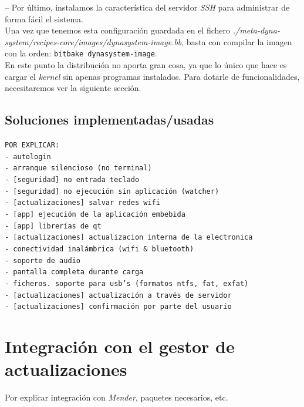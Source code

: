 -- Por último, instalamos la característica del servidor \textit{SSH} para administrar de forma fácil el sistema.\\

Una vez que tenemos esta configuración guardada en el fichero \textit{./meta-dyna-system/recipes-core/images/dynasystem-image.bb}, basta con compilar la imagen con la orden: \texttt{bitbake dynasystem-image}.\\

En este punto la distribución no aporta gran cosa, ya que lo único que hace es cargar el \textit{kernel} sin apenas programas instalados. Para dotarle de funcionalidades, necesitaremos ver la siguiente sección.

\subsection{Soluciones implementadas/usadas}

\texttt{POR EXPLICAR:\\
	- autologin\\
	- arranque silencioso (no terminal)\\
	- [seguridad] no entrada teclado\\
	- [seguridad] no ejecución sin aplicación (watcher)\\
	- [actualizaciones] salvar redes wifi\\
	- [app] ejecución de la aplicación embebida\\
	- [app] librerías de qt\\
	- [actualizaciones] actualizacion interna de la electronica\\
	- conectividad inalámbrica (wifi \& bluetooth)\\
	- soporte de audio\\
	- pantalla completa durante carga\\
	- ficheros. soporte para usb's (formatos ntfs, fat, exfat)\\
	- [actualizaciones] actualización a través de servidor\\
	- [actualizaciones] confirmación por parte del usuario}\\

\section{Integración con el gestor de actualizaciones}

Por explicar integración con \textit{Mender}, paquetes necesarios, etc.

\newpage